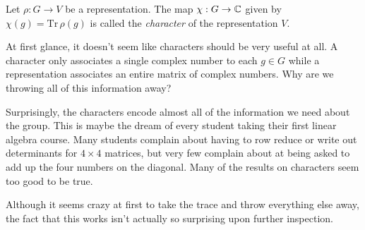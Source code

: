 \begin{definition}
    Let $\rho : G \rightarrow V$ be a representation. The map $\chi : G \rightarrow \mathbb{C}$ given by $\chi(g) = 
    \text{Tr}\,\rho(g)$ is called the \emph{character} of the representation $V$.
\end{definition}

At first glance, it doesn't seem like characters should be very useful at all. A character only associates a single 
complex number to each $g \in G$ while a representation associates an entire matrix of complex numbers. Why are we 
throwing all of this information away?

Surprisingly, the characters encode almost all of the information we need about the group. This is maybe the dream 
of every student taking their first linear algebra course. Many students complain about having to row reduce or 
write out determinants for $4 \times 4$ matrices, but very few complain about at being asked to add up the four 
numbers on the diagonal.  Many of the results on characters seem too good to be true.

Although it seems crazy at first to take the trace and throw everything else away, the fact that this works isn't 
actually so surprising upon further inspection.

    






